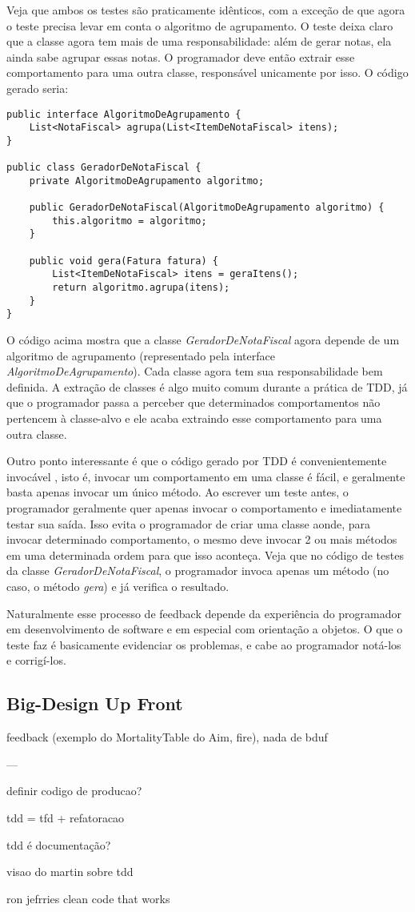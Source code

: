 Veja que ambos os testes são praticamente idênticos, com a exceção de que agora o teste precisa levar em conta o algoritmo de agrupamento. 
O teste deixa claro que a classe agora tem mais de uma responsabilidade: além de gerar notas, ela ainda sabe agrupar essas notas. O programador
deve então extrair esse comportamento para uma outra classe, responsável unicamente por isso. O código gerado seria:

\begin{lstlisting}[frame=trbl]
public interface AlgoritmoDeAgrupamento {
	List<NotaFiscal> agrupa(List<ItemDeNotaFiscal> itens);
}

public class GeradorDeNotaFiscal {
	private AlgoritmoDeAgrupamento algoritmo;
	
	public GeradorDeNotaFiscal(AlgoritmoDeAgrupamento algoritmo) {
		this.algoritmo = algoritmo;
	}
	
	public void gera(Fatura fatura) {
		List<ItemDeNotaFiscal> itens = geraItens();
		return algoritmo.agrupa(itens);
	}
}
\end{lstlisting}

O código acima mostra que a classe \textit{GeradorDeNotaFiscal} agora depende de um algoritmo de agrupamento (representado pela interface
\textit{AlgoritmoDeAgrupamento}). Cada classe agora tem sua responsabilidade bem definida. A extração de classes é algo muito comum
durante a prática de TDD, já que o programador passa a perceber que determinados comportamentos não pertencem à classe-alvo e ele
acaba extraindo esse comportamento para uma outra classe. 

Outro ponto interessante é que o código gerado por TDD é convenientemente invocável \cite{bob-martin}, isto é, invocar um comportamento em uma classe
é fácil, e geralmente basta apenas invocar um único método. Ao escrever um teste antes, o programador geralmente quer apenas invocar
o comportamento e imediatamente testar sua saída. Isso evita o programador de criar uma classe aonde, para invocar determinado comportamento,
o mesmo deve invocar 2 ou mais métodos em uma determinada ordem para que isso aconteça. 
Veja que no código de testes da classe \textit{GeradorDeNotaFiscal}, o programador
invoca apenas um método (no caso, o método \textit{gera}) e já verifica o resultado. 

Naturalmente esse processo de feedback depende da experiência do programador em desenvolvimento de software e em especial 
com orientação a objetos. O que o teste faz é basicamente evidenciar os problemas, e cabe ao programador notá-los e
corrigí-los.
 
\subsection{Big-Design Up Front}





feedback (exemplo do MortalityTable do Aim, fire), nada de bduf


---


definir codigo de producao?


tdd = tfd + refatoracao

tdd é documentação?

visao do martin sobre tdd

ron jefrries clean code that works

